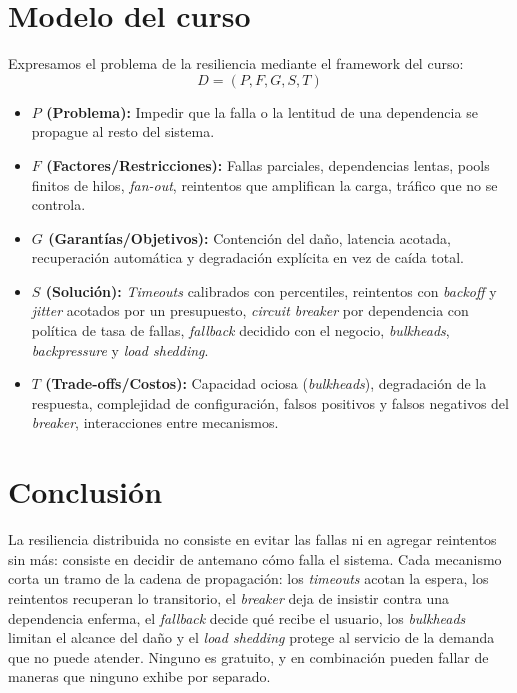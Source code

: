 \documentclass[variant=apuntes,cover=institutional,mode=screen]{ua-engineering-v6-article}
\begin{document}
\section{Modelo del curso}

Expresamos el problema de la resiliencia mediante el framework del curso:
\[
D = (P, F, G, S, T)
\]

\begin{itemize}
\item \textbf{$P$ (Problema):} Impedir que la falla o la lentitud de una dependencia se propague al resto del sistema.
\item \textbf{$F$ (Factores/Restricciones):} Fallas parciales, dependencias lentas, pools finitos de hilos, \emph{fan-out}, reintentos que amplifican la carga, tráfico que no se controla.
\item \textbf{$G$ (Garantías/Objetivos):} Contención del daño, latencia acotada, recuperación automática y degradación explícita en vez de caída total.
\item \textbf{$S$ (Solución):} \emph{Timeouts} calibrados con percentiles, reintentos con \emph{backoff} y \emph{jitter} acotados por un presupuesto, \emph{circuit breaker} por dependencia con política de tasa de fallas, \emph{fallback} decidido con el negocio, \emph{bulkheads}, \emph{backpressure} y \emph{load shedding}.
\item \textbf{$T$ (Trade-offs/Costos):} Capacidad ociosa (\emph{bulkheads}), degradación de la respuesta, complejidad de configuración, falsos positivos y falsos negativos del \emph{breaker}, interacciones entre mecanismos.
\end{itemize}

\section{Conclusión}

La resiliencia distribuida no consiste en evitar las fallas ni en agregar reintentos sin más: consiste en decidir de antemano cómo falla el sistema. Cada mecanismo corta un tramo de la cadena de propagación: los \emph{timeouts} acotan la espera, los reintentos recuperan lo transitorio, el \emph{breaker} deja de insistir contra una dependencia enferma, el \emph{fallback} decide qué recibe el usuario, los \emph{bulkheads} limitan el alcance del daño y el \emph{load shedding} protege al servicio de la demanda que no puede atender. Ninguno es gratuito, y en combinación pueden fallar de maneras que ninguno exhibe por separado.
\end{document}
